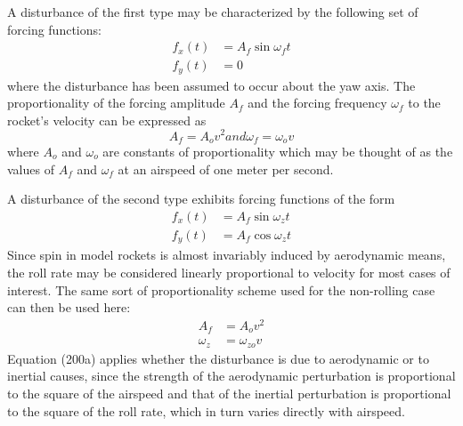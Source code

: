 A disturbance of the first type may be characterized by the following set of forcing functions:
\begin{subequations}\label{ch4:eq:162}
\begin{align}
f_x(t) &= A_f\sin\omega_f t \label{ch4:eq:162a}\\
f_y(t) &= 0 \label{ch4:eq:162b}
\end{align}
\end{subequations}
where the disturbance has been assumed to occur about the yaw axis. The proportionality of the
forcing amplitude $A_f$ and the forcing frequency $\omega_f$ to the rocket's velocity can be
expressed as
\begin{subequations}\label{ch4:eq:163}
\begin{equation}\label{ch4:eq:163a}
A_f = A_o v^{2}
\end{equation}
and
\begin{equation}\label{ch4:eq:163b}
\omega_f = \omega_o v
\end{equation}
\end{subequations}
where $A_o$ and $\omega_o$ are constants of proportionality which may be thought of as the values
of $A_f$ and $\omega_f$ at an airspeed of one meter per second.

A disturbance of the second type exhibits forcing functions of the form
\begin{subequations}\label{ch4:eq:164}
\begin{align}
f_x(t) &= A_f\sin\omega_z t \label{ch4:eq:164a}\\
f_y(t) &= A_f\cos\omega_z t \label{ch4:eq:164b}
\end{align}
\end{subequations}
Since spin in model rockets is almost invariably induced by aerodynamic means, the roll rate may
be considered linearly proportional to velocity for most cases of interest. The same sort of
proportionality scheme used for the non-rolling case can then be used here:
\begin{subequations}\label{ch4:eq:165}
\begin{align}
A_f &= A_o v^{2} \label{ch4:eq:165a}\\
\omega_z &= \omega_{zo} v \label{ch4:eq:165b}
\end{align}
\end{subequations}
Equation (200a) applies whether the disturbance is due to aerodynamic or to inertial causes,
since the strength of the aerodynamic perturbation is proportional to the square of the airspeed
and that of the inertial perturbation is proportional to the square of the roll rate, which in turn
varies directly with airspeed.

